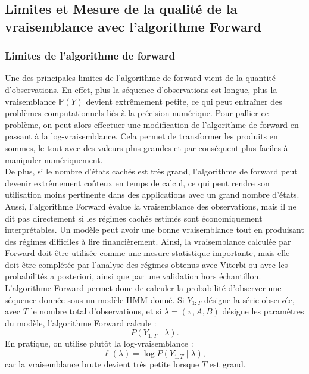 \documentclass[11pt]{article}
\begin{document}
\subsection{Limites et Mesure de la qualité de la vraisemblance avec l'algorithme Forward}

\subsubsection{Limites de l'algorithme de forward}
Une des principales limites de l'algorithme de forward vient de la quantité d'observations. En effet, plus la séquence d'observations est longue, plus la vraisemblance $\mathbb{P}(Y)$ devient extrêmement petite, ce qui peut entraîner des problèmes computationnels liés à la précision numérique.
Pour pallier ce problème, on peut alors effectuer une modification de l'algorithme de forward en passant à la log-vraisemblance. Cela permet de transformer les produits en sommes, le tout avec des valeurs plus grandes et par conséquent plus faciles à manipuler numériquement.\\
De plus, si le nombre d'états cachés est très grand, l'algorithme de forward peut devenir extrêmement coûteux en temps de calcul, ce qui peut rendre son utilisation moins pertinente dans des applications avec un grand nombre d'états.\\

Aussi, l'algorithme Forward évalue la vraisemblance des observations, mais il ne dit pas directement si les régimes cachés estimés sont économiquement interprétables. Un modèle peut avoir une bonne vraisemblance tout en produisant des régimes difficiles à lire financièrement.
Ainsi, la vraisemblance calculée par Forward doit être utilisée comme une mesure statistique importante, mais elle doit être complétée par l'analyse des régimes obtenus avec Viterbi ou avec les probabilités a posteriori, ainsi que par une validation hors échantillon.\\

L'algorithme Forward permet donc de calculer la probabilité d'observer une séquence donnée sous un modèle HMM donné. Si \(Y_{1:T}\) désigne la série observée, avec \(T\) le nombre total d'observations, et si \(\lambda=(\pi,A,B)\) désigne les paramètres du modèle, l'algorithme Forward calcule :
\[
P(Y_{1:T}\mid \lambda).
\]
En pratique, on utilise plutôt la log-vraisemblance :
\[
\ell(\lambda)=\log P(Y_{1:T}\mid \lambda),
\]
car la vraisemblance brute devient très petite lorsque \(T\) est grand.
\end{document}

